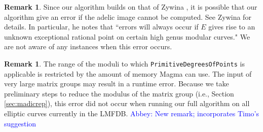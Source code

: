 \documentclass[11pt,reqno]{amsart}
\theoremstyle{plain}
\theoremstyle{definition}
\newtheorem{remark}[theorem]{Remark}
\newcommand{\abbey}[1]{\textcolor{blue}{Abbey: #1}}
\begin{document}
\begin{remark}
Since our algorithm builds on that of Zywina \cite{ZywinaAlgorithm}, it is possible that our algorithm give an error if the adelic image cannot be computed. See Zywina \cite{ZywinaImagesGit} for details. In particular, he notes that ``errors will always occur if $E$ gives rise to an unknown exceptional rational point on certain high genus modular curves." We are not aware of any instances when this error occurs.
\end{remark}

\begin{remark}
The range of the moduli to which \texttt{PrimitiveDegreesOfPoints} is applicable is restricted by the amount of memory Magma can use. The input of very large matrix groups may result in a runtime error. Because we take preliminary steps to reduce the modulus of the matrix group (i.e., Section \ref{sec:madicrep}), this error did not occur when running our full algorithm on all elliptic curves currently in the LMFDB. \abbey{New remark; incorporates Timo's suggestion}
\end{remark}
\end{document}
